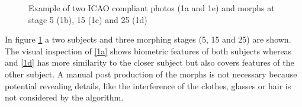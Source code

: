 \begin{figure}[h]
{	\label{1d}}\hfill
	\caption{Example of two ICAO compliant photos (1a and 1e) and morphs at stage 5 (1b), 15 (1c) and 25 (1d)}
	\label{fig1} 
\end{figure}

In figure \ref{fig1} a two subjects and three morphing stages (5, 15 and 25) are shown. The visual inspection of \ref{1a} shows biometric features of both subjects whereas  and \ref{1d} has more similarity to the closer subject but also covers features of the other subject.
A manual post production of the morphs is not necessary because potential revealing details, like the interference  of the clothes, glasses or hair is not considered by the algorithm.

